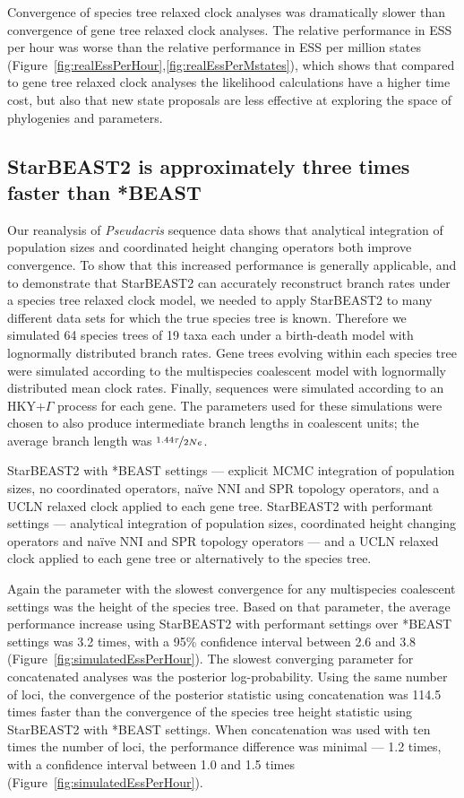 \documentclass[12pt]{article}
\begin{document}
Convergence of species tree relaxed clock analyses was dramatically slower than
convergence of gene tree relaxed clock analyses. The relative performance in ESS
per hour was worse than the relative performance in ESS per million states
(Figure~\ref{fig:realEssPerHour},\ref{fig:realEssPerMstates}), which shows that
compared to gene tree relaxed clock analyses the likelihood calculations have a
higher time cost, but also that new state proposals are less effective at
exploring the space of phylogenies and parameters.

\subsection{StarBEAST2 is approximately three times faster than *BEAST}

Our reanalysis of \textit{Pseudacris} sequence data shows that analytical
integration of population sizes and coordinated height changing operators both
improve convergence. To show that this increased performance is generally
applicable, and to demonstrate that StarBEAST2 can accurately reconstruct branch
rates under a species tree relaxed clock model, we needed to apply StarBEAST2 to
many different data sets for which the true species tree is known. Therefore we
simulated 64 species trees of 19 taxa each under a birth-death model with
lognormally distributed branch rates. Gene trees evolving within each species
tree were simulated according to the multispecies coalescent model with
lognormally distributed mean clock rates. Finally, sequences were simulated
according to an HKY+$\Gamma$ process for each gene. The parameters used for
these simulations were chosen to also produce intermediate branch lengths in
coalescent units; the average branch length was $\nicefrac{1.44\tau}{2Ne}$.

StarBEAST2 with *BEAST settings --- explicit MCMC integration of population
sizes, no coordinated operators, na\"ive NNI and SPR topology operators, and a
UCLN relaxed clock applied to each gene tree. StarBEAST2 with performant
settings --- analytical integration of population sizes, coordinated height
changing operators and na\"ive NNI and SPR topology operators --- and a UCLN
relaxed clock applied to each gene tree or alternatively to the species tree.

Again the parameter with the slowest convergence for any multispecies coalescent
settings was the height of the species tree. Based on that parameter, the
average performance increase using StarBEAST2 with performant settings over
*BEAST settings was 3.2 times, with a 95\% confidence interval between 2.6 and
3.8 (Figure~\ref{fig:simulatedEssPerHour}). The slowest converging parameter for
concatenated analyses was the posterior log-probability. Using the same number
of loci, the convergence of the posterior statistic using concatenation was
114.5 times faster than the convergence of the species tree height statistic
using StarBEAST2 with *BEAST settings. When concatenation was used with ten
times the number of loci, the performance difference was minimal --- 1.2 times,
with a confidence interval between 1.0 and 1.5 times
(Figure~\ref{fig:simulatedEssPerHour}).
\end{document}
